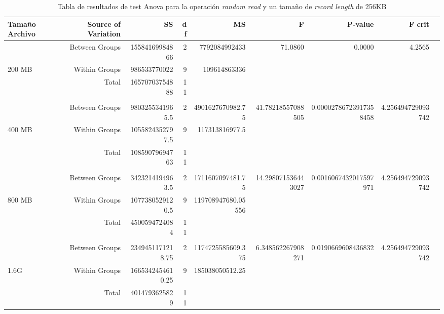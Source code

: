 \begin{landscape}
\begin{table}[!htp]\centering
\caption{Tabla de resultados de test Anova para la operación \textit{random read} y un tamaño de \textit{record length} de 256KB}\label{tab: }
\scriptsize
\begin{tabular}{lrrrrrrrr}\toprule
Tamaño Archivo &Source of Variation &SS &df &MS &F &P-value &F crit \\\midrule
&Between Groups &15584169984866 &2 &7792084992433 &71.0860 &0.0000 &4.2565 \\
200 MB &Within Groups &986533770022 &9 &109614863336 & & & \\
&Total &16570703754888 &11 & & & & \\
& & & & & & & \\
&Between Groups &9803255341965.5 &2 &4901627670982.75 &41.78218557088505 &0.00002786723917358458 &4.256494729093742 \\
400 MB &Within Groups &1055824352797.5 &9 &117313816977.5 & & & \\
&Total &10859079694763 &11 & & & & \\
& & & & & & & \\
&Between Groups &3423214194963.5 &2 &1711607097481.75 &14.298071536443027 &0.0016067432017597971 &4.256494729093742 \\
800 MB &Within Groups &1077380529120.5 &9 &119708947680.05556 & & & \\
&Total &4500594724084 &11 & & & & \\
& & & & & & & \\
&Between Groups &2349451171218.75 &2 &1174725585609.375 &6.348562267908271 &0.0190669608436832 &4.256494729093742 \\
1.6G &Within Groups &1665342454610.25 &9 &185038050512.25 & & & \\
&Total &4014793625829 &11 & & & & \\

\end{tabular}
\end{table}
\end{landscape}
